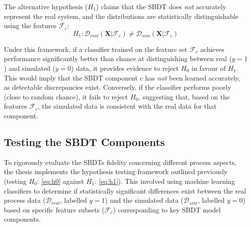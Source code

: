 \noindent The alternative hypothesis ($H_1$) claims that the SBDT does \textit{not} accurately represent the real system, and the distributions are statistically distinguishable using the features $\mathcal{F}_c$:
\begin{equation}
    H_1: \mathcal{D}_{real}(\mathbf{X} | \mathcal{F}_c) \neq \mathcal{D}_{sim}(\mathbf{X} | \mathcal{F}_c)
    \label{eq:h1}
\end{equation}

\noindent Under this framework, if a classifier trained on the feature set $\mathcal{F}_c$ achieves performance significantly better than chance at distinguishing between real ($y=1$) and simulated ($y=0$) data, it provides evidence to reject $H_0$ in favour of $H_1$. This would imply that the SBDT component $c$ has \textit{not} been learned accurately, as detectable discrepancies exist. Conversely, if the classifier performs poorly (close to random chance), it fails to reject $H_0$, suggesting that, based on the features $\mathcal{F}_c$, the simulated data is consistent with the real data for that component.

\subsection*{Testing the SBDT Components}
To rigorously evaluate the SBDTs fidelity concerning different process aspects, the thesis implements the hypothesis testing framework outlined previously (testing $H_0$: \autoref{eq:h0} against $H_1$: \autoref{eq:h1}). This involved using machine learning classifiers to determine if statistically significant differences exist between the real process data ($\mathcal{D}_{real}$, labelled $y=1$) and the simulated data ($\mathcal{D}_{sim}$, labelled $y=0$) based on specific feature subsets ($\mathcal{F}_c$) corresponding to key SBDT model components.

